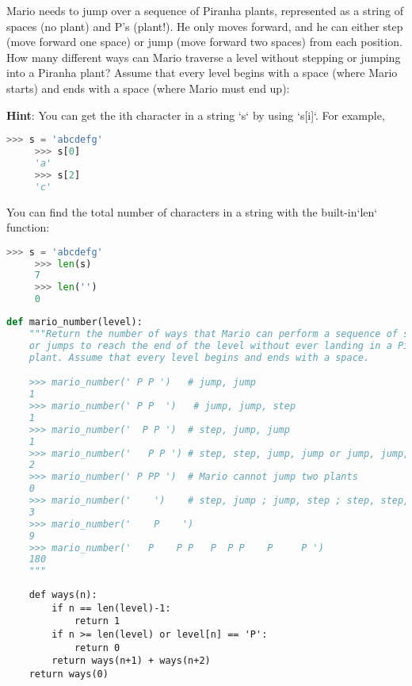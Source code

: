 \question
Mario needs to jump over a sequence of Piranha plants, represented as a string of spaces (no plant) and P's (plant!).  He only moves forward, and he can either step (move forward one space) or jump (move forward two spaces) from each position.  How many different ways can Mario traverse a level without stepping or jumping into a Piranha plant? Assume that every level begins with a space (where Mario starts) and ends with a space (where Mario must end up):

\textbf{Hint}: You can get the ith character in a string `s` by using `s[i]`. For example,
\begin{lstlisting}[language=Python]
     >>> s = 'abcdefg'
     >>> s[0]
     'a'
     >>> s[2]
     'c'
\end{lstlisting}
You can find the total number of characters in a string with the built-in`len` function:
\begin{lstlisting}[language=Python]
     >>> s = 'abcdefg'
     >>> len(s)
     7
     >>> len('')
     0
\end{lstlisting}
\begin{lstlisting}[language=Python]
def mario_number(level):
    """Return the number of ways that Mario can perform a sequence of steps
    or jumps to reach the end of the level without ever landing in a Piranha
    plant. Assume that every level begins and ends with a space.

    >>> mario_number(' P P ')   # jump, jump
    1
    >>> mario_number(' P P  ')   # jump, jump, step
    1
    >>> mario_number('  P P ')  # step, jump, jump
    1
    >>> mario_number('   P P ') # step, step, jump, jump or jump, jump, jump
    2
    >>> mario_number(' P PP ')  # Mario cannot jump two plants
    0
    >>> mario_number('    ')    # step, jump ; jump, step ; step, step, step
    3
    >>> mario_number('    P    ')
    9
    >>> mario_number('   P    P P   P  P P    P     P ')
    180
    """
\end{lstlisting}
\begin{solution}[1in]
\begin{lstlisting}
	def ways(n):
        if n == len(level)-1:
            return 1
        if n >= len(level) or level[n] == 'P':
            return 0
        return ways(n+1) + ways(n+2)
    return ways(0)
\end{lstlisting}
\end{solution}

